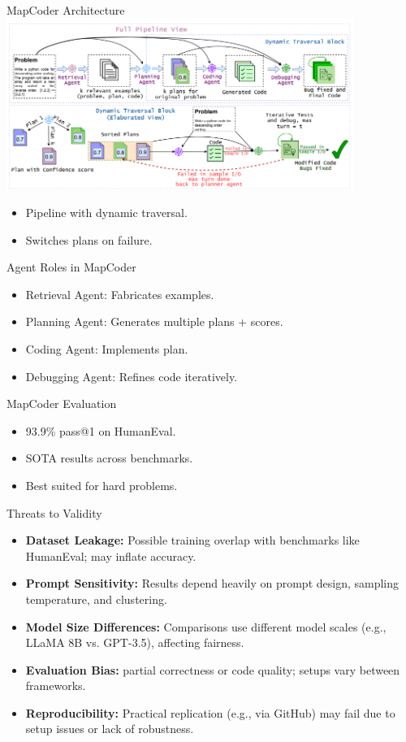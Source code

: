 \documentclass{beamer}
\begin{document}
	\begin{frame}{MapCoder Architecture}
	  \includegraphics[width=0.85\textwidth]{mapcoder-architecture.png}
	  \begin{itemize}
	    \item Pipeline with dynamic traversal.
	    \item Switches plans on failure.
	  \end{itemize}
	\end{frame}
	
	\begin{frame}{Agent Roles in MapCoder}
	  \begin{itemize}
	    \item Retrieval Agent: Fabricates examples.
	    \item Planning Agent: Generates multiple plans + scores.
	    \item Coding Agent: Implements plan.
	    \item Debugging Agent: Refines code iteratively.
	  \end{itemize}
	\end{frame}
	
	\begin{frame}{MapCoder Evaluation}
	  \begin{itemize}
	    \item 93.9\% pass@1 on HumanEval.
	    \item SOTA results across benchmarks.
	    \item Best suited for hard problems.
	  \end{itemize}
	\end{frame}
	
	\begin{frame}{Threats to Validity}
	\begin{itemize}
	  \item \textbf{Dataset Leakage:} Possible training overlap with benchmarks like HumanEval; may inflate accuracy.
	  \item \textbf{Prompt Sensitivity:} Results depend heavily on prompt design, sampling temperature, and clustering.
	  \item \textbf{Model Size Differences:} Comparisons use different model scales (e.g., LLaMA 8B vs. GPT-3.5), affecting fairness.
	  \item \textbf{Evaluation Bias:} partial correctness or code quality; setups vary between frameworks.
	  \item \textbf{Reproducibility:} Practical replication (e.g., via GitHub) may fail due to setup issues or lack of robustness.
	\end{itemize}
	\end{frame}
	
\end{document}
